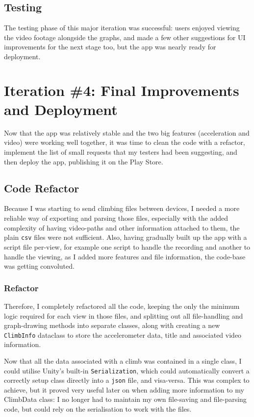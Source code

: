 \subsection{Testing}
The testing phase of this major iteration was successful: users enjoyed viewing the video footage alongside the graphs, and made a few other suggestions for UI improvements for the next stage too, but the app was nearly ready for deployment.




\section{Iteration \#4: Final Improvements and Deployment}
Now that the app was relatively stable and the two big features (acceleration and video) were working well together, it was time to clean the code with a refactor, implement the list of small requests that my testers had been suggesting, and then deploy the app, publishing it on the Play Store.

\subsection{Code Refactor}
Because I was starting to send climbing files between devices, I needed a more reliable way of exporting and parsing those files, especially with the added complexity of having video-paths and other information attached to them, the plain \verb|csv| files were not sufficient.
Also, having gradually built up the app with a script file per-view, for example one script to handle the recording and another to handle the viewing, as I added more features and file information, the code-base was getting convoluted.


\subsubsection{Refactor}
Therefore, I completely refactored all the code, keeping the only the minimum logic required for each view in those files, and splitting out all file-handling and graph-drawing methods into separate classes, along with creating a new \verb|ClimbInfo| dataclass to store the accelerometer data, title and associated video information.

Now that all the data associated with a climb was contained in a single class, I could utilise Unity's built-in \verb|Serialization|, which could automatically convert a correctly setup class directly into a \verb|json| file, and visa-versa. 
This was complex to achieve, but it proved very useful later on when adding more information to my ClimbData class: I no longer had to maintain my own file-saving and file-parsing code, but could rely on the serialisation to work with the files.


